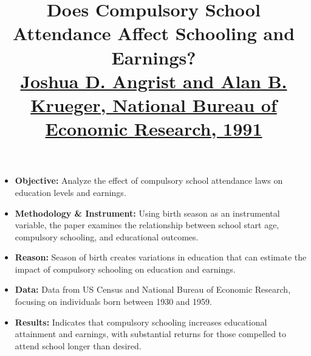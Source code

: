 \documentclass{article}
\begin{document}
\title{\textbf{Does Compulsory School Attendance Affect Schooling and Earnings?} \\
\footnotesize \textsuperscript{ }\href{https://www.nber.org/papers/w3572}{Joshua D. Angrist and Alan B. Krueger, National Bureau of Economic Research, 1991}}
\maketitle
\begin{itemize}
\item \textbf{Objective:} Analyze the effect of compulsory school attendance laws on education levels and earnings.
\item \textbf{Methodology \& Instrument:} Using birth season as an instrumental variable, the paper examines the relationship between school start age, compulsory schooling, and educational outcomes.
\item \textbf{Reason:} Season of birth creates variations in education that can estimate the impact of compulsory schooling on education and earnings.
\item \textbf{Data:} Data from US Census and National Bureau of Economic Research, focusing on individuals born between 1930 and 1959.
\item \textbf{Results:} Indicates that compulsory schooling increases educational attainment and earnings, with substantial returns for those compelled to attend school longer than desired.
\end{itemize}
\end{document}
